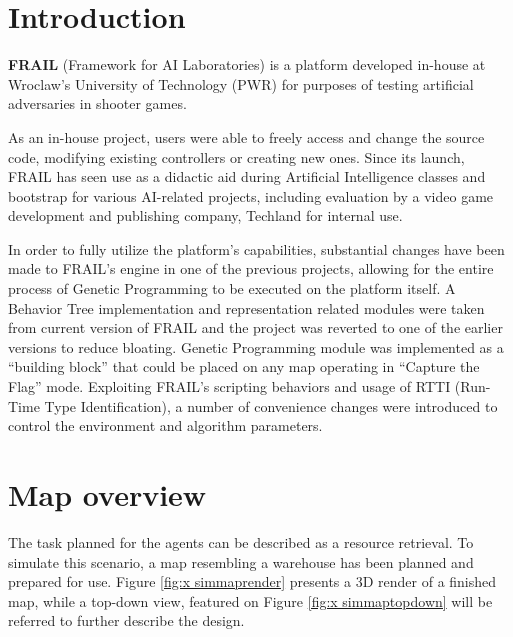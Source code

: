 \section{Introduction}
\textbf{FRAIL} (Framework for AI Laboratories) is a platform developed in-house at Wroclaw's University of Technology (PWR) for purposes of testing artificial adversaries in shooter games. \cite{frailweb}

As an in-house project, users were able to freely access and change the source code, modifying existing controllers or creating new ones. Since its launch, FRAIL has seen use as a didactic aid during Artificial Intelligence classes and bootstrap for various AI-related projects, including evaluation by a video game development and publishing company, Techland for internal use. %

In order to fully utilize the platform's capabilities, substantial changes have been made to FRAIL's engine in one of the previous projects, allowing for the entire process of Genetic Programming to be executed on the platform itself. A Behavior Tree implementation and representation related modules were taken from current version of FRAIL and the project was reverted to one of the earlier versions to reduce bloating. Genetic Programming module was implemented as a ``building block'' that could be placed on any map operating in ``Capture the Flag'' mode. Exploiting FRAIL's scripting behaviors and usage of RTTI (Run-Time Type Identification), a number of convenience changes were introduced to control the environment and algorithm parameters.
\section{Map overview} %
The task planned for the agents can be described as a resource retrieval. To simulate this scenario, a map resembling a warehouse has been planned and prepared for use. Figure \ref{fig:x simmaprender} presents a 3D render of a finished map, while a top-down view, featured on Figure \ref{fig:x simmaptopdown} will be referred to further describe the design.

